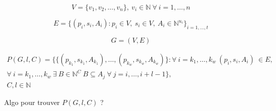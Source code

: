 \documentclass{article}
\begin{document}
\begin{equation}
V = \{v_1,v_2,\ldots,v_n \}, \ v_i \in \mathbb{N} \ \forall \ i=1,\ldots,n 
\end{equation}

\begin{equation}
 E = \{ (p_i,s_i, A_i ): p_i \in V, \ s_i \in V, \ A_i \in \mathbb{N}^{u_i}\}_{i=1,\ldots,t }
\end{equation}

\begin{equation}
 G = (V,E) 
\end{equation}

\begin{multline}
 P(G,l,C) = \{ \{ (p_{k_1},s_{k_1}, A_{k_1} ),\ldots, (p_{k_w},s_{k_w}, A_{k_w}) \} : 
 \forall \ i = k_1,\ldots,k_w \ (p_i,s_i, A_i ) \ \in E, \\
  \forall \ i = k_1,\ldots,k_w  \ \exists \ B \in \mathbb{N}^C \   B \subseteq A_j \ \forall \ j=i,\ldots,i+l -1 \} ,\\
C,l \in \mathbb{N}
\end{multline}

Algo pour trouver $P(G,l,C)$ ?
\end{document}
